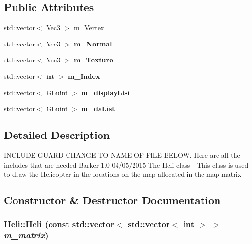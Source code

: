 \subsection*{Public Attributes}
\begin{DoxyCompactItemize}
\item 
std::vector$<$ \hyperlink{classVec3}{Vec3} $>$ \hyperlink{classHeli_a56fb01569dcca41ad98e4b847ea883bd}{m\_\-Vertex}
\item 
\hypertarget{classHeli_a4ed961abf468aaa11ba5357e7ab25606}{
std::vector$<$ \hyperlink{classVec3}{Vec3} $>$ {\bfseries m\_\-Normal}}
\label{classHeli_a4ed961abf468aaa11ba5357e7ab25606}

\item 
\hypertarget{classHeli_a0d3e7df6c305ef5ddec3db51b29ab618}{
std::vector$<$ \hyperlink{classVec3}{Vec3} $>$ {\bfseries m\_\-Texture}}
\label{classHeli_a0d3e7df6c305ef5ddec3db51b29ab618}

\item 
\hypertarget{classHeli_ada6c912d3aaa65508d54b5b50671e5be}{
std::vector$<$ int $>$ {\bfseries m\_\-Index}}
\label{classHeli_ada6c912d3aaa65508d54b5b50671e5be}

\item 
\hypertarget{classHeli_a31c707568b6e70332b34e1f1a6b9a5c1}{
std::vector$<$ GLuint $>$ {\bfseries m\_\-displayList}}
\label{classHeli_a31c707568b6e70332b34e1f1a6b9a5c1}

\item 
\hypertarget{classHeli_ac773d4120d072043710d6f40bb93f2b0}{
std::vector$<$ GLuint $>$ {\bfseries m\_\-daList}}
\label{classHeli_ac773d4120d072043710d6f40bb93f2b0}

\end{DoxyCompactItemize}


\subsection{Detailed Description}
INCLUDE GUARD CHANGE TO NAME OF FILE BELOW. Here are all the includes that are needed  Barker  1.0 04/05/2015 The \hyperlink{classHeli}{Heli} class -\/ This class is used to draw the Helicopter in the locations on the map allocated in the map matrix 

\subsection{Constructor \& Destructor Documentation}
\hypertarget{classHeli_afdc33af64542d4e838d90f3b5d87fb5a}{
\subsubsection[{Heli}]{\setlength{\rightskip}{0pt plus 5cm}Heli::Heli (const std::vector$<$ std::vector$<$ int $>$ $>$ {\em m\_\-matrix})}}
\label{classHeli_afdc33af64542d4e838d90f3b5d87fb5a}


